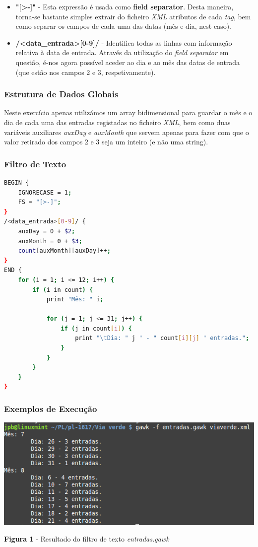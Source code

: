 \documentclass{article}
\begin{document}
\begin{itemize}
    \item \textbf{"[\textgreater-]"} - Esta expressão é usada como \textbf{field separator}. Desta maneira, torna-se bastante simples extrair do ficheiro \emph{XML} atributos de cada \emph{tag}, bem como separar os campos de cada uma das datas (mês e dia, nest caso).
    \item \textbf{/\textless data\_entrada\textgreater[0-9]/} - Identifica todas as linhas com informação relativa à data de entrada. Através da utilização do \emph{field separator} em questão, é-nos agora possível aceder ao dia e ao mês das datas de entrada (que estão nos campos 2 e 3, respetivamente).
\end{itemize}

\subsubsection{Estrutura de Dados Globais}

Neste exercício apenas utilizámos um array bidimensional para guardar o mês e o dia de cada uma das entradas registadas no ficheiro \emph{XML}, bem como duas variáveis auxiliares \emph{auxDay} e \emph{auxMonth} que servem apenas para fazer com que o valor retirado dos campos 2 e 3 seja um inteiro (e não uma string).

\subsubsection{Filtro de Texto}

\begin{lstlisting}[language=bash]
BEGIN {
	IGNORECASE = 1;
	FS = "[>-]";
}
/<data_entrada>[0-9]/ {
	auxDay = 0 + $2;
	auxMonth = 0 + $3;
	count[auxMonth][auxDay]++;
}
END {
	for (i = 1; i <= 12; i++) {
		if (i in count) {
			print "Mês: " i;

			for (j = 1; j <= 31; j++) {
				if (j in count[i]) {
					print "\tDia: " j " - " count[i][j] " entradas.";
				}
			} 
		}
	}
}
\end{lstlisting}

\subsubsection{Exemplos de Execução}

\begin{center}
    \includegraphics[scale=1]{imagens/entradas}
    \caption{\textbf{Figura 1} - Resultado do filtro de texto \emph{entradas.gawk}}
\end{center}
\end{document}
